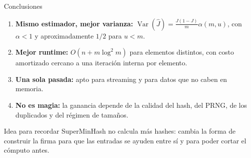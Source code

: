 \documentclass[aspectratio=169,11pt]{beamer}
\begin{document}
\begin{frame}{Conclusiones}
  \begin{enumerate}
    \item \textbf{Mismo estimador, mejor varianza:}
          $\operatorname{Var}(\widehat J)=\frac{J(1-J)}{m}\alpha(m,u)$,
          con $\alpha<1$ y aproximadamente $1/2$ para $u<m$.
    \item \textbf{Mejor runtime:} $O(n+m\log^2m)$ para elementos distintos,
          con costo amortizado cercano a una iteraci\'on interna por elemento.
    \item \textbf{Una sola pasada:} apto para streaming y para datos que no
          caben en memoria.
    \item \textbf{No es magia:} la ganancia depende de la calidad del hash,
          del PRNG, de los duplicados y del r\'egimen de tama\~nos.
  \end{enumerate}
  \vfill
  \begin{block}{Idea para recordar}
    \centering
    \small
    SuperMinHash no calcula m\'as hashes: cambia la forma de construir la
    firma para que las entradas se ayuden entre s\'i y para poder cortar el
    c\'omputo antes.
  \end{block}
\end{frame}
\end{document}
